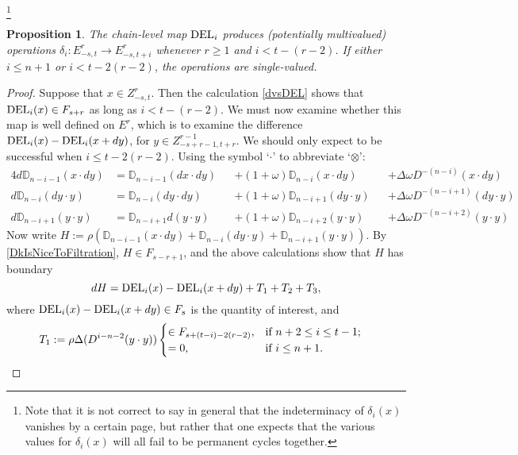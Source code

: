\documentclass[11pt]{amsart}
\theoremstyle{plain}
\newtheorem{prop}[thm]{Proposition}
\theoremstyle{definition}
\renewcommand{\to}{\longrightarrow}
\theoremstyle{plain}
\newcommand{\twist}{\omega}
\begin{document}
\begin{External spectral sequence operations}
\footnote{Note that it is not correct to say in general that the indeterminacy of $\delta_i(x)$ vanishes by a certain page, but rather that one expects that the various values for $\delta_i(x)$ will all fail to be permanent cycles together.}
\begin{prop}
The chain-level map $\textup{DEL}_i$ produces (potentially multivalued) operations $\delta_i:E^r_{-s,t}\to E^r_{-s,t+i}$ whenever $r\geq1$ and $i<t-(r-2)$. If either $i\leq n+1$ or $i<t-2(r-2)$, the operations are single-valued.
\end{prop}
\begin{proof}
Suppose that $x\in Z^r_{-s,t}$. Then the calculation \ref{dvsDEL} shows that $\textup{DEL}_i(x)\in F_{s+r}$ as long as $i<t-(r-2)$. We must now examine whether this map is well defined on $E^r$, which is to examine the difference $\textup{DEL}_i(x)-\textup{DEL}_i(x+dy)$, for $y\in Z^{r-1}_{-s+r-1,t+r}$. We should only expect to be successful when $i\leq t-2(r-2)$.
Using the symbol `$\cdot$' to abbreviate `$\otimes$':
\small
\begin{alignat*}{4}
d\mathbb{D}_{n-i-1}(x\cdot dy)&=
{\mathbb{D}_{n-i-1}(dx\cdot dy)}&&+
(1{+}\twist)\mathbb{D}_{n-i}(x\cdot dy)&&+
\Delta\twist D^{-(n-i)}(x\cdot dy)\\
d\mathbb{D}_{n-i}(dy\cdot y)&=
\mathbb{D}_{n-i}(dy\cdot dy)&&+
(1{+}\twist)\mathbb{D}_{n-i+1}(dy\cdot y)&&+
\Delta\twist D^{-(n-i+1)}(dy\cdot y)\\
d\mathbb{D}_{n-i+1}(y\cdot y)&=
\mathbb{D}_{n-i+1}d(y\cdot y)&&+
{(1{+}\twist)\mathbb{D}_{n-i+2}(y\cdot y)}&&+
\Delta\twist D^{-(n-i+2)}(y\cdot y)
\end{alignat*}
\normalsize
Now write $H:=\rho(\mathbb{D}_{n-i-1}(x\cdot dy)+\mathbb{D}_{n-i}(dy\cdot y)+\mathbb{D}_{n-i+1}(y\cdot y))$. By \ref{DkIsNiceToFiltration}, $H\in F_{s-r+1}$, and the above calculations show that $H$ has boundary
\small
\[dH=\textup{DEL}_i(x)-\textup{DEL}_i(x+dy)+T_1+T_2+T_3,\]
\normalsize
where $\textup{DEL}_i(x)-\textup{DEL}_i(x+dy)\in F_s$ is the quantity of interest, and
\begin{align*}
T_1:=\rho\Delta(D^{i-n-2}(y\cdot y))&\begin{cases}
\in F_{s+(t-i)-2(r-2)},&\textup{if }n+2\leq i\leq t-1;\\
=0,&\textup{if }i\leq n+1.
\end{cases}

\end{align*}
\end{proof}
\end{External spectral sequence operations}
\end{document}
